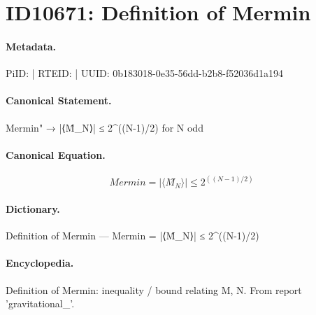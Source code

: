 \section*{ID10671: Definition of Mermin}
\paragraph{Metadata.}
PiID:  | RTEID:  | UUID: 0b183018-0e35-56dd-b2b8-f52036d1a194

\paragraph{Canonical Statement.}
Mermin" → |⟨M̂\_N⟩| ≤ 2\textasciicircum{}((N-1)/2) for N odd

\paragraph{Canonical Equation.}
\[
Mermin = |⟨M̂_N⟩| ≤ 2^((N-1)/2)
\]

\paragraph{Dictionary.}
Definition of Mermin — Mermin = |⟨M̂\_N⟩| ≤ 2\textasciicircum{}((N-1)/2)

\paragraph{Encyclopedia.}
Definition of Mermin: inequality / bound relating M, N. From report 'gravitational\_'.

